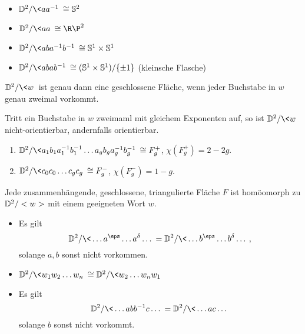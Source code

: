 \begin{ex}
	\begin{itemize}
		\item
			$\D^2 / \<aa^{-1}\> \homeomorphic \S^2$
		\item
			$\D^2 / \<aa\> \homeomorphic \R\P^2$
		\item
			$\D^2 / \<aba^{-1}b^{-1}\> \homeomorphic \S^1 \times \S^1$
		\item
			$\D^2 / \<abab^{-1}\> \homeomorphic (\S^1 \times \S^1) / \{\pm 1\}$ (kleinsche Flasche)
	\end{itemize}
\end{ex}

\begin{st}
	$\D^2 / \<w\>$ ist genau dann eine geschlossene Fläche, wenn jeder Buchstabe in $w$ genau zweimal vorkommt.

	Tritt ein Buchstabe in $w$ zweimaml mit gleichem Exponenten auf, so ist $\D^2 / \<w\>$ nicht-orientierbar, andernfalls orientierbar.
\end{st}

\begin{ex}
	\begin{enumerate}[(1)]
		\item
			$\D^2 / \<a_1b_1a_1^{-1}b_1^{-1} \dotsc a_gb_ga_g^{-1}b_g^{-1} \> \homeomorphic F_g^+$,
			$\chi(F_g^+) = 2 - 2g$.
		\item
			$\D^2 / \<c_0c_0 \dotsc c_gc_g\> \homeomorphic F_g^-$,
			$\chi(F_g^-) = 1 - g$.
	\end{enumerate}
\end{ex}

\begin{lem}
	Jede zusammenhängende, geschlossene, triangulierte Fläche $F$ ist homöomorph zu $\mathbb{D}^2 / <w>$ mit einem geeigneten Wort $w$.
\end{lem}

\begin{lem}
	\begin{itemize}
		\item
			Es gilt
			\[
				\D^2 / \<\dotsc a^\eps \dotsc a^\delta \dotsc \>
				= \D^2 / \<\dotsc b^\eps \dotsc b^\delta \dotsc \>,
			\]
			solange $a, b$ sonst nicht vorkommen.
		\item
			$\D^2 / \<w_1 w_2 \dotsc w_n\> \homeomorphic \D^2 / \<w_2 \dotsc w_n w_1\>$
		\item
			Es gilt
			\[
				\D^2 / \<\dotsc abb^{-1}c \dotsc \> = \D^2 / \< \dotsc ac \dotsc \>
			\]
			solange $b$ sonst nicht vorkommt.
	\end{itemize}
\end{lem}

